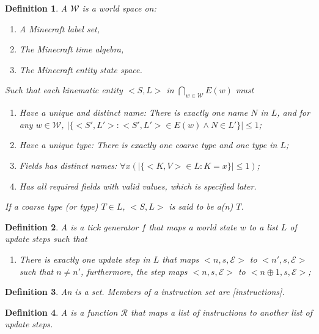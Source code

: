 \documentclass{book}
\newtheorem{definition}{Definition}
\theoremstyle{definition}\newtheorem{mechanism}{Mechanism}
\theoremstyle{remark}\newtheorem*{remark}{Remark}
\begin{document}
\begin{definition}
	A  $\mathcal W$ is a world space on:
	
	\begin{enumerate}
		\item A Minecraft label set,
		\item The Minecraft time algebra,
		\item The Minecraft entity state space.
	\end{enumerate}
	
	Such that each kinematic entity $<S, L>$ in $\bigcap_{w\in \mathcal W} E(w)$ must
	
	\begin{enumerate}
		\item Have a unique and distinct name: There is exactly one name $N$ in $L$, and for any $w\in \mathcal W$, $|\{<S', L'>: <S', L'>\in E(w)\land N\in L'\}| \le 1$;
		\item Have a unique type: There is exactly one coarse type and one type in $L$;
		\item Fields has distinct names: $\forall x(|\{<K, V>\in L: K = x\}|\le 1)$;
		\item Has all required fields with valid values, which is specified later.
	\end{enumerate}
	
	If a coarse type (or type) $T \in L$, $<S, L>$ is said to be a(n) $T$.
\end{definition}

\begin{definition}
	A  is a tick generator $f$ that maps a world state $w$ to a list $L$ of update steps such that
	
	\begin{enumerate}
		\item There is exactly one update step in $L$ that maps $<n, s, \mathcal E>$ to $<n', s, \mathcal E>$ such that $n \ne n'$, furthermore, the step maps $<n, s, \mathcal E>$ to $<n \oplus 1, s, \mathcal E>$;
	\end{enumerate}
\end{definition}

\begin{definition}
	An  is a set. Members of a instruction set are [instructions].
\end{definition}

\begin{definition}
	A  is a function $\mathscr R$ that maps a list of instructions to another list of update steps.
\end{definition}
\end{document}

